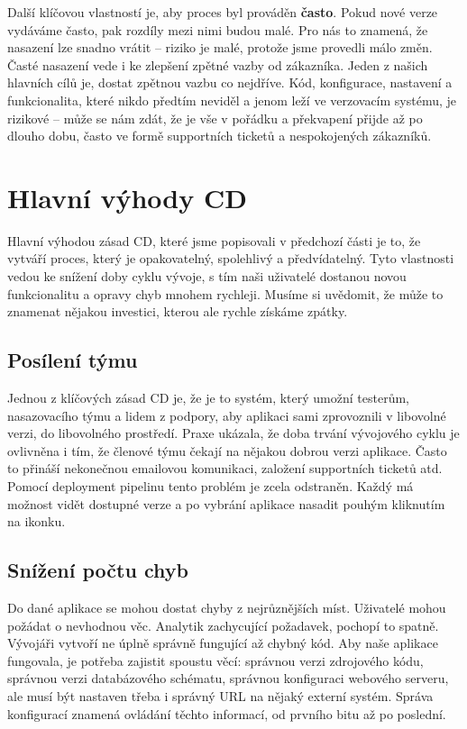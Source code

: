 Další klíčovou vlastností je, aby proces byl prováděn \textbf{často}. Pokud nové verze vydáváme často, pak rozdíly mezi nimi budou malé. Pro nás to znamená, že nasazení lze snadno vrátit -- riziko je malé, protože jsme provedli málo změn. Časté nasazení vede i ke zlepšení zpětné vazby od zákazníka. Jeden z našich hlavních cílů je, dostat zpětnou vazbu co nejdříve. Kód, konfigurace, nastavení a funkcionalita, které nikdo předtím neviděl a jenom leží ve verzovacím systému, je rizikové -- může se nám zdát, že je vše v pořádku a překvapení přijde až po dlouho dobu, často ve formě supportních ticketů a nespokojených zákazníků.

\section{Hlavní výhody CD}
Hlavní výhodou zásad CD, které jsme popisovali v předchozí části je to, že vytváří proces, který je opakovatelný, spolehlivý a předvídatelný. Tyto vlastnosti vedou ke snížení doby cyklu vývoje, s tím naši uživatelé dostanou novou funkcionalitu a opravy chyb mnohem rychleji. Musíme si uvědomit, že může to znamenat nějakou investici, kterou ale rychle získáme zpátky.

\subsection{Posílení týmu}
Jednou z klíčových zásad CD je, že je to systém, který umožní testerům, nasazovacího týmu a lidem z podpory, aby aplikaci sami zprovoznili v libovolné verzi, do libovolného prostředí. Praxe ukázala, že doba trvání vývojového cyklu je ovlivněna i tím, že členové týmu čekají na nějakou dobrou verzi aplikace. Často to přináší nekonečnou emailovou komunikaci, založení supportních ticketů atd. Pomocí deployment pipelinu tento problém je zcela odstraněn. Každý má možnost vidět dostupné verze a po vybrání aplikace nasadit pouhým kliknutím na ikonku.

\subsection{Snížení počtu chyb}
Do dané aplikace se mohou dostat chyby z nejrůznějších míst. Uživatelé mohou požádat o nevhodnou věc. Analytik zachycující požadavek, pochopí to spatně. Vývojáři vytvoří ne úplně správně fungující až chybný kód. 
Aby naše aplikace fungovala, je potřeba zajistit spoustu věcí: správnou verzi zdrojového kódu, správnou verzi databázového schématu, správnou konfiguraci webového serveru, ale musí být nastaven třeba i správný URL na nějaký externí systém. Správa konfigurací znamená ovládání těchto informací, od prvního bitu až po poslední.

